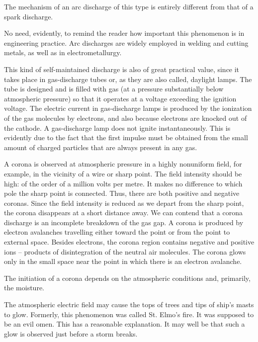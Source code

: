 The mechanism of an arc discharge of this type is entirely different from that of a spark discharge.

No need, evidently, to remind the reader how important this phenomenon is in engineering practice. Arc discharges are widely employed in welding and cutting metals, as well as in electrometallurgy.

\noindent{} This kind of self-maintained discharge is also of great practical value, since it takes place in gas-discharge tubes or, as they are also called, daylight lamps. The tube is designed and is filled with gas
(at a pressure substantially below atmospheric pressure) so that it operates at a voltage exceeding the ignition voltage. The electric current in gas-discharge lamps is produced by the ionization of the gas molecules by electrons, and also because electrons are knocked out of the cathode. A gas-discharge lamp does not ignite instantaneously. This is evidently due to the fact that the first impulse must be obtained from the small amount of charged particles that are always present in any gas.

\noindent{} A corona is observed at atmospheric pressure in a highly nonuniform field, for example, in the vicinity of a wire or sharp point. The field intensity should be high: of the order of a million volts per metre. It makes no difference to which pole the sharp point is connected. Thus, there are both positive and negative coronas. Since the field intensity is reduced as we depart from the sharp point, the corona disappears at a short distance away. We can contend that a corona discharge is an incomplete breakdown of the gas gap. A corona is produced by electron avalanches travelling either toward the point or from the point to external space. Besides electrons, the corona region contains negative and positive ions -- products of disintegration of the neutral air molecules. The corona glows only in the small space near the point in which there is an electron avalanche.


The initiation of a corona depends on the atmospheric conditions and, primarily, the moisture.

The atmospheric electric field may cause the tops of trees and tips of ship's masts to glow. Formerly, this phenomenon was called St. Elmo's fire. It was supposed to be an evil omen. This has a reasonable explanation. It may well be that such a glow is observed just before a storm breaks.

